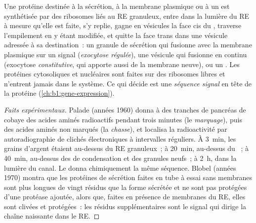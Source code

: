 \begin{proposition}\label{prop:b1:eukaryotic-cell:secretory}
Une protéine destinée à la sécrétion, à la membrane plasmique ou à un
 est synthétisée par des ribosomes liés au RE granuleux, entre
dans la lumière du RE à mesure qu'elle est faite, s'y replie, gagne en
vésicules la face cis du , traverse l'empilement en y étant
modifiée, et quitte la face trans dans une vésicule adressée à sa
destination~: un granule de sécrétion qui fusionne avec la membrane
plasmique sur un signal (\emph{exocytose régulée}),
une vésicule qui fusionne en continu (exocytose \emph{constitutive}, qui
apporte aussi de la membrane neuve), ou un . Les protéines
cytosoliques et nucléaires sont faites sur des ribosomes libres et
n'entrent jamais dans le système. Ce qui décide est une \emph{séquence
signal} en tête de la protéine
(\cref{ch:b1:gene-expression}).
\end{proposition}
\begin{proof}[Faits expérimentaux]
Palade (années 1960) donna à des tranches de pancréas de cobaye des
acides aminés radioactifs pendant trois minutes (le \emph{marquage}),
puis des acides aminés non marqués (la \emph{chasse}), et localisa la
radioactivité par autoradiographie de clichés électroniques à
intervalles réguliers. À \qty{3}{min}, les grains d'argent étaient
au-dessus du RE granuleux~; à \qty{20}{min}, au-dessus du ~; à
\qty{40}{min}, au-dessus des  de condensation et des granules
neufs~; à \qty{2}{h}, dans la lumière du canal. Le  donna chimiquement la même séquence. Blobel (années 1970)
montra que les protéines de sécrétion faites en tube à essai sans
membranes sont plus longues de vingt résidus que la forme sécrétée et
ne sont pas protégées d'une protéase ajoutée, alors que, faites en
présence de membranes du RE, elles sont clivées et protégées~: les
résidus supplémentaires sont le signal qui dirige la chaîne naissante
dans le RE.
\end{proof}

